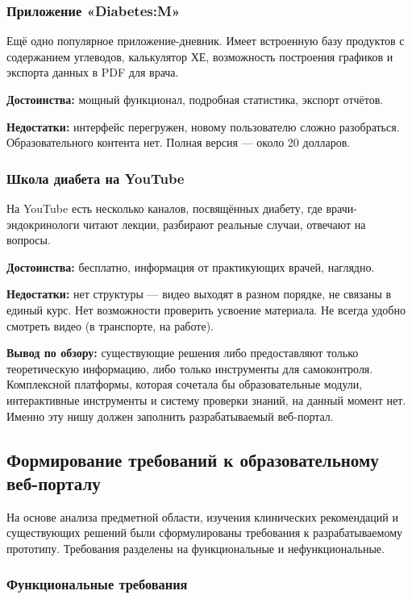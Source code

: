 \documentclass[14pt, a4paper]{extarticle}
\begin{document}
\subsubsection{Приложение «Diabetes:M»}

\noindent Ещё одно популярное приложение-дневник. Имеет встроенную базу продуктов с содержанием углеводов, калькулятор ХЕ, возможность построения графиков и экспорта данных в PDF для врача.

\medskip
\noindent \textbf{Достоинства:} мощный функционал, подробная статистика, экспорт отчётов.

\medskip
\noindent \textbf{Недостатки:} интерфейс перегружен, новому пользователю сложно разобраться. Образовательного контента нет. Полная версия — около 20 долларов.

\subsubsection{Школа диабета на YouTube}

\noindent На YouTube есть несколько каналов, посвящённых диабету, где врачи-эндокринологи читают лекции, разбирают реальные случаи, отвечают на вопросы.

\medskip
\noindent \textbf{Достоинства:} бесплатно, информация от практикующих врачей, наглядно.

\medskip
\noindent \textbf{Недостатки:} нет структуры — видео выходят в разном порядке, не связаны в единый курс. Нет возможности проверить усвоение материала. Не всегда удобно смотреть видео (в транспорте, на работе).

\medskip
\noindent \textbf{Вывод по обзору:} существующие решения либо предоставляют только теоретическую информацию, либо только инструменты для самоконтроля. Комплексной платформы, которая сочетала бы образовательные модули, интерактивные инструменты и систему проверки знаний, на данный момент нет. Именно эту нишу должен заполнить разрабатываемый веб-портал.

\subsection{Формирование требований к образовательному веб-порталу}

\noindent На основе анализа предметной области, изучения клинических рекомендаций и существующих решений были сформулированы требования к разрабатываемому прототипу. Требования разделены на функциональные и нефункциональные.
\vskip 5cm
\subsubsection{Функциональные требования}
\end{document}
